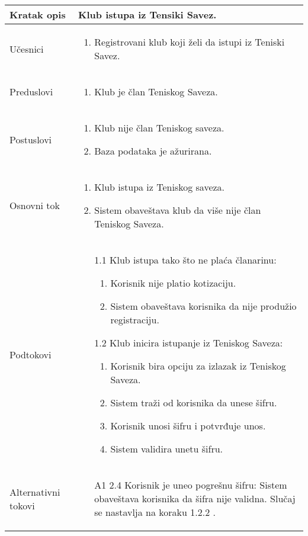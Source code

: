 \documentclass{article}
\begin{document}
\begin{longtable}{| p{} | p{} |} 
\hline
    Kratak opis & Klub istupa iz Tensiki Savez.\\ 
\hline    
    Učesnici & \begin{enumerate}
        \item Registrovani klub koji želi da istupi iz Teniski Savez.
    \end{enumerate}
         
    \\
\hline
   Preduslovi & \begin{enumerate}
       \item Klub je član Teniskog Saveza.
   \end{enumerate}\\
\hline  
    Postuslovi & \begin{enumerate}
        \item Klub nije član Teniskog saveza.
        \item Baza podataka je ažurirana.
    \end{enumerate}\\
\hline
    Osnovni tok & \begin{enumerate}
        \item Klub istupa iz Teniskog saveza.
        \item Sistem obaveštava klub da više nije član Teniskog Saveza.
    \end{enumerate}
    \\

\hline
    Podtokovi &  \begin{enumerate}
        \item[1.1] Klub istupa tako što ne plaća članarinu:\begin{enumerate}
            \item Korisnik nije platio kotizaciju. 
            \item Sistem obaveštava korisnika da nije produžio registraciju.
        \end{enumerate}
        \item[1.2] Klub inicira istupanje iz Teniskog Saveza: \begin{enumerate}
            \item Korisnik bira opciju za izlazak iz Teniskog Saveza.
            \item Sistem traži od korisnika da unese šifru.
            \item Korisnik unosi šifru i potvrđuje unos.
            \item Sistem validira unetu šifru.
        \end{enumerate}
    \end{enumerate}\\
  \hline  
    Alternativni tokovi & \begin{enumerate}
            \item[A1] 2.4 Korisnik je uneo pogrešnu šifru: Sistem obaveštava korisnika da šifra nije validna. Slučaj se nastavlja na koraku 1.2.2 .
        \end{enumerate}\\



\end{longtable}
\end{document}
